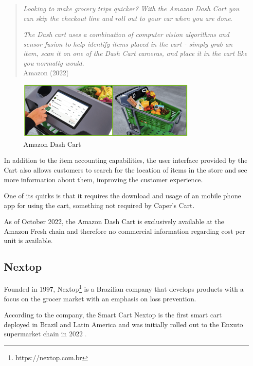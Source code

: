 \documentclass[openright]{normas-utf-tex} %
\begin{document}
\begin{quote}
\textit{Looking to make grocery trips quicker? With the Amazon Dash Cart you can skip the checkout line and roll out to your car when you are done.}

\textit{The Dash cart uses a combination of computer vision algorithms and sensor fusion to help identify items placed in the cart - simply grab an item, scan it on one of the Dash Cart cameras, and place it in the cart like you normally would.}
\\
Amazon (2022)
\end{quote}

\begin{figure}[H]
	\centering
	\includegraphics[width=0.8\textwidth]{./images/dashcart.png}
    \caption[Amazon Dash Cart]{Amazon Dash Cart}
    \label{fig:dashcart}
\end{figure}

In addition to the item accounting capabilities, the user interface provided by
the Cart also allows customers to search for the location of items  in the
store and see more information about them, improving the customer experience.

One of its quirks is that it requires the download and usage of an mobile phone
app for using the cart, something not required by Caper's Cart.

As of October 2022, the Amazon Dash Cart is exclusively available at the Amazon
Fresh chain and therefore no commercial information regarding cost per unit is
available.

\subsection{Nextop}

Founded in 1997, Nextop\footnote{https://nextop.com.br} is a Brazilian company
that develops products with a focus on the grocer market with an emphasis on
loss prevention.

According to the company, the Smart Cart Nextop is the first smart cart
deployed in Brazil and Latin America and was initially rolled out to the Enxuto
supermarket chain in 2022 \cite{Paraiba2022}.
\end{document}

